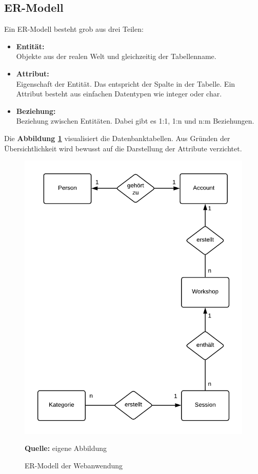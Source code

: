 \subsection{ER-Modell}
\label{subsec:ER-Modell}
Ein ER-Modell besteht grob aus drei Teilen:
\begin{itemize}
\item \textbf{Entität:}\\
Objekte aus der realen Welt und gleichzeitig der Tabellenname.
\item \textbf{Attribut:}\\
Eigenschaft der Entität. Das entspricht der Spalte in der Tabelle. Ein Attribut besteht aus einfachen Datentypen wie integer oder char.
\item \textbf{Beziehung:}\\
Beziehung zwischen Entitäten. Dabei gibt es 1:1, 1:n und n:m Beziehungen.
\end{itemize}

\newpage
Die \textbf{Abbildung \ref{fig:ER-Modell}} visualisiert die Datenbanktabellen. Aus Gründen der Übersichtlichkeit wird bewusst auf die Darstellung der Attribute verzichtet.\bigskip

\begin{figure}[H]
  \begin{center}
    \includegraphics[scale=0.8]{img/erModell}
	\caption{ER-Modell der Webanwendung} 
	\footnotesize\sffamily\textbf{Quelle:} eigene Abbildung  
	\label{fig:ER-Modell}
  \end{center}   
\end{figure}

